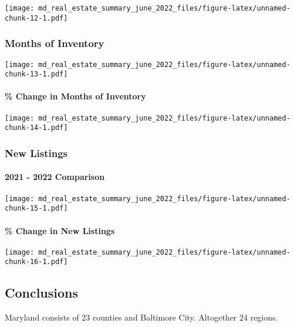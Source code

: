 \documentclass[
]{article}
\begin{document}
\texttt{[image: md\_real\_estate\_summary\_june\_2022\_files/figure-latex/unnamed-chunk-12-1.pdf]}

\hypertarget{months-of-inventory}{%
\subsubsection{Months of Inventory}\label{months-of-inventory}}

\texttt{[image: md\_real\_estate\_summary\_june\_2022\_files/figure-latex/unnamed-chunk-13-1.pdf]}

\hypertarget{change-in-months-of-inventory}{%
\paragraph{\% Change in Months of
Inventory}\label{change-in-months-of-inventory}}

\texttt{[image: md\_real\_estate\_summary\_june\_2022\_files/figure-latex/unnamed-chunk-14-1.pdf]}

\hypertarget{new-listings}{%
\subsubsection{New Listings}\label{new-listings}}

\hypertarget{comparison-6}{%
\paragraph{2021 - 2022 Comparison}\label{comparison-6}}

\texttt{[image: md\_real\_estate\_summary\_june\_2022\_files/figure-latex/unnamed-chunk-15-1.pdf]}

\hypertarget{change-in-new-listings}{%
\paragraph{\% Change in New Listings}\label{change-in-new-listings}}

\texttt{[image: md\_real\_estate\_summary\_june\_2022\_files/figure-latex/unnamed-chunk-16-1.pdf]}

\hypertarget{conclusions}{%
\subsection{Conclusions}\label{conclusions}}

Maryland consists of 23 counties and Baltimore City. Altogether 24
regions.
\end{document}

